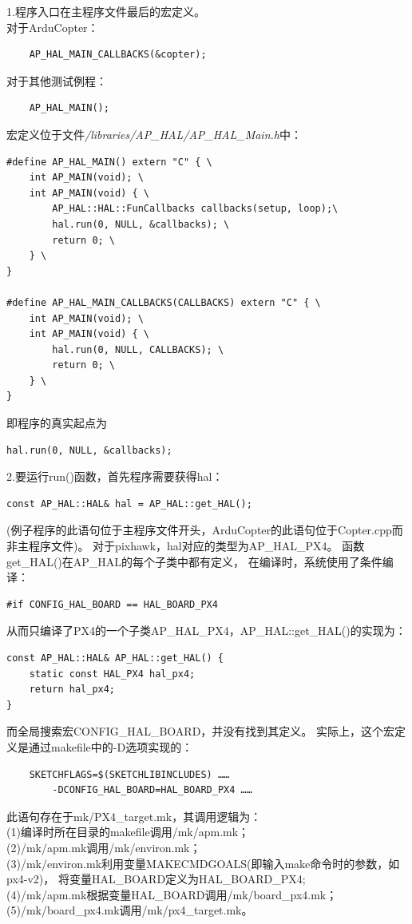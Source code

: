 \documentclass[a4paper,10pt]{ctexart} %
\begin{document}
1.程序入口在主程序文件最后的宏定义。\\
\noindent 对于ArduCopter：
\begin{lstlisting}
	AP_HAL_MAIN_CALLBACKS(&copter);
\end{lstlisting}
对于其他测试例程：
\begin{lstlisting}
	AP_HAL_MAIN();
\end{lstlisting}
宏定义位于文件\textit{/libraries/AP\_HAL/AP\_HAL\_Main.h}中：
\begin{lstlisting}
#define AP_HAL_MAIN() extern "C" { \
	int AP_MAIN(void); \
	int AP_MAIN(void) { \
		AP_HAL::HAL::FunCallbacks callbacks(setup, loop);\
		hal.run(0, NULL, &callbacks); \
		return 0; \
	} \
}

#define AP_HAL_MAIN_CALLBACKS(CALLBACKS) extern "C" { \
	int AP_MAIN(void); \
	int AP_MAIN(void) { \
		hal.run(0, NULL, CALLBACKS); \
		return 0; \
	} \
}
\end{lstlisting}
即程序的真实起点为
\begin{lstlisting}
hal.run(0, NULL, &callbacks); 
\end{lstlisting}

2.要运行run()函数，首先程序需要获得hal：
\begin{lstlisting}
const AP_HAL::HAL& hal = AP_HAL::get_HAL();
\end{lstlisting}
(例子程序的此语句位于主程序文件开头，ArduCopter的此语句位于Copter.cpp而非主程序文件)。
对于pixhawk，hal对应的类型为AP\_HAL\_PX4。
函数get\_HAL()在AP\_HAL的每个子类中都有定义，
在编译时，系统使用了条件编译：
\begin{lstlisting}
#if CONFIG_HAL_BOARD == HAL_BOARD_PX4
\end{lstlisting}
从而只编译了PX4的一个子类AP\_HAL\_PX4，AP\_HAL::get\_HAL()的实现为：
\begin{lstlisting}
const AP_HAL::HAL& AP_HAL::get_HAL() {
    static const HAL_PX4 hal_px4;
    return hal_px4;
}
\end{lstlisting}
而全局搜索宏CONFIG\_HAL\_BOARD，并没有找到其定义。
实际上，这个宏定义是通过makefile中的-D选项实现的：

\begin{lstlisting}
	SKETCHFLAGS=$(SKETCHLIBINCLUDES) ……
	 	-DCONFIG_HAL_BOARD=HAL_BOARD_PX4 ……
\end{lstlisting}
此语句存在于mk/PX4\_target.mk，其调用逻辑为：\\
(1)编译时所在目录的makefile调用/mk/apm.mk；\\
(2)/mk/apm.mk调用/mk/environ.mk；\\
(3)/mk/environ.mk利用变量MAKECMDGOALS(即输入make命令时的参数，如px4-v2)，
将变量HAL\_BOARD定义为HAL\_BOARD\_PX4;\\
(4)/mk/apm.mk根据变量HAL\_BOARD调用/mk/board\_px4.mk；\\
(5)/mk/board\_px4.mk调用/mk/px4\_target.mk。
\end{document}

